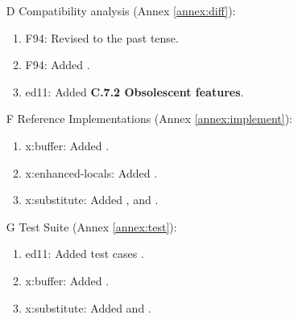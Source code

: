 \begin{itemize}
	\item[D] Compatibility analysis 				(Annex \ref{annex:diff}):
		\begin{enumerate}
		\item \textsf{F94}: Revised  to the past tense.
		\item \textsf{F94}: Added .
		\item \textsf{ed11}: Added \textbf{C.7.2 Obsolescent features}.
		\end{enumerate}

	\item[F] Reference Implementations			(Annex \ref{annex:implement}):
		\begin{enumerate}
		\item \textsf{x:buffer}: Added .
		\item \textsf{x:enhanced-locals}: Added .
		\item \textsf{x:substitute}: Added
			,
			 and
			.
		\end{enumerate}

	\item[G] Test Suite								(Annex \ref{annex:test}):
		\begin{enumerate}
		\item \textsf{ed11}: Added test cases .
		\item \textsf{x:buffer}: Added .
		\item \textsf{x:substitute}: Added
			 and
			.
		\end{enumerate}
	\end{itemize}


